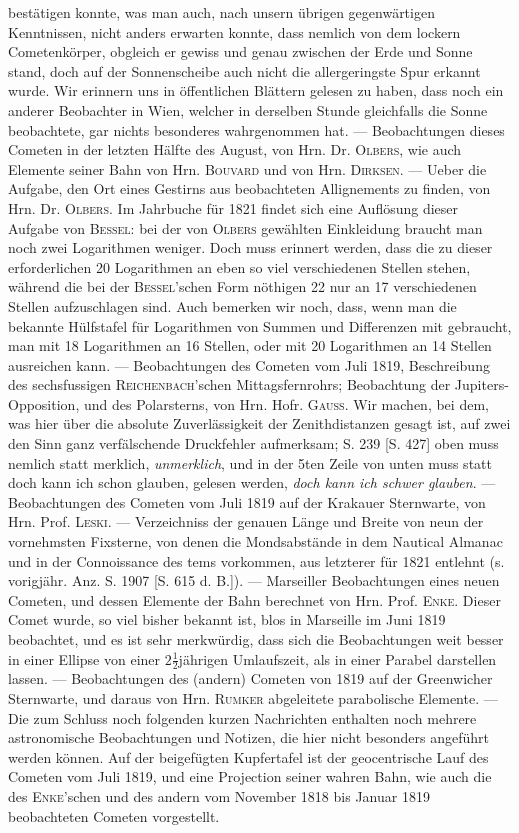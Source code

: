 \noindent bestätigen konnte, was man auch, nach unsern übrigen gegenwärtigen Kenntnissen, nicht anders erwarten konnte, dass nemlich von dem lockern Cometenkörper, obgleich er gewiss und genau zwischen der Erde und Sonne stand, doch auf der Sonnenscheibe auch nicht die allergeringste Spur erkannt wurde. Wir erinnern uns in öffentlichen Blättern gelesen zu haben, dass noch ein anderer Beobachter in Wien, welcher in derselben Stunde gleichfalls die Sonne beobachtete, gar nichts besonderes wahrgenommen hat. --- Beobachtungen dieses Cometen in der letzten Hälfte des August, von Hrn. Dr. \textsc{Olbers}, wie auch Elemente seiner Bahn von Hrn. \textsc{Bouvard} und von Hrn. \textsc{Dirksen}. --- Ueber die Aufgabe, den Ort eines Gestirns aus beobachteten Allignements zu finden, von Hrn. Dr. \textsc{Olbers}. Im Jahrbuche für 1821 findet sich eine Auflösung dieser Aufgabe von \textsc{Bessel}: bei der von \textsc{Olbers} gewählten Einkleidung braucht man noch zwei Logarithmen weniger. Doch muss erinnert werden, dass die zu dieser erforderlichen 20 Logarithmen an eben so viel verschiedenen Stellen stehen, während die bei der \textsc{Bessel}'schen Form nöthigen 22 nur an 17 verschiedenen Stellen aufzuschlagen sind. Auch bemerken wir noch, dass, wenn man die bekannte Hülfstafel für Logarithmen von Summen und Differenzen mit gebraucht, man mit 18 Logarithmen an 16 Stellen, oder mit 20 Logarithmen an 14 Stellen ausreichen kann. --- Beobachtungen des Cometen vom Juli 1819, Beschreibung des sechsfussigen \textsc{Reichenbach}'schen Mittagsfernrohrs; Beobachtung der Jupiters-Opposition, und des Polarsterns, von Hrn. Hofr. \textsc{Gauss}. Wir machen, bei dem, was hier über die absolute Zuverlässigkeit der Zenithdistanzen gesagt ist, auf zwei den Sinn ganz verfälschende Druckfehler aufmerksam; S. 239 [S. 427] oben muss nemlich statt merklich, \emph{unmerklich}, und in der 5ten Zeile von unten muss statt doch kann ich schon glauben, gelesen werden, \emph{doch kann ich schwer glauben}. --- Beobachtungen des Cometen vom Juli 1819 auf der Krakauer Sternwarte, von Hrn. Prof. \textsc{Leski}. --- Verzeichniss der genauen Länge und Breite von neun der vornehmsten Fixsterne, von denen die Mondsabstände in dem Nautical Almanac und in der Connoissance des tems vorkommen, aus letzterer für 1821 entlehnt (s. vorigjähr. Anz. S. 1907 [S. 615 d. B.]). --- Marseiller Beobachtungen eines neuen Cometen, und dessen Elemente der Bahn berechnet von Hrn. Prof. \textsc{Enke}. Dieser Comet wurde, so viel bisher bekannt ist, blos in Marseille im Juni 1819 beobachtet, und es ist sehr merkwürdig, dass sich die Beobachtungen weit besser in einer Ellipse von einer $2\frac{1}{2}$jährigen 
Umlaufszeit, als in einer Parabel darstellen lassen. --- Beobachtungen des (andern) Cometen von 1819 auf der Greenwicher Sternwarte, und daraus von Hrn. \textsc{Rumker} abgeleitete parabolische Elemente. --- Die zum Schluss noch folgenden kurzen Nachrichten enthalten noch mehrere astronomische Beobachtungen und Notizen, die hier nicht besonders angeführt werden können. Auf der beigefügten Kupfertafel ist der geocentrische Lauf des Cometen vom Juli 1819, und eine Projection seiner wahren Bahn, wie auch die des \textsc{Enke}'schen und des andern vom November 1818 bis Januar 1819 beobachteten Cometen vorgestellt.
